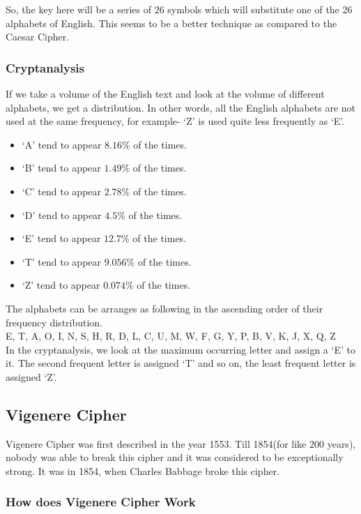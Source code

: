\documentclass[a4paper]{article}
\begin{document}
So, the key here will be a series of 26 symbols which will substitute one of the 26 alphabets of English. This seems to be a better technique as compared to the Caesar Cipher. 

\subsubsection{Cryptanalysis}
If we take a volume of the English text and look at the volume of different alphabets, we get a distribution. In other words, all the English alphabets are not used at the same frequency, for example- `Z' is used quite less frequently as `E'. 
\begin{itemize}
\item `A' tend to appear $8.16 \%$ of the times. 
\item `B' tend to appear $1.49 \%$ of the times. 
\item `C' tend to appear $2.78 \%$ of the times. 
\item `D' tend to appear $4.5 \%$ of the times. 
\item `E' tend to appear $12.7 \%$ of the times. 
\item `T' tend to appear $9.056 \%$ of the times. 
\item `Z' tend to appear $0.074 \%$ of the times. 
\end{itemize}

The alphabets can be arranges as following in the ascending order of their frequency distribution. \\
E, T, A, O, I, N, S, H, R, D, L, C, U, M, W, F, G, Y, P, B, V, K, J, X, Q, Z\\

In the cryptanalysis, we look at the maximum occurring letter and assign a `E' to it. The second frequent letter is assigned `T' and so on, the least frequent letter is assigned `Z'.

\subsection{Vigenere Cipher} 
Vigenere Cipher was first described in the year 1553. Till 1854(for like 200 years), nobody was able to break this cipher and it was considered to be exceptionally strong. It was in 1854, when Charles Babbage broke this cipher. 

\subsubsection{How does Vigenere Cipher Work}
\end{document}
